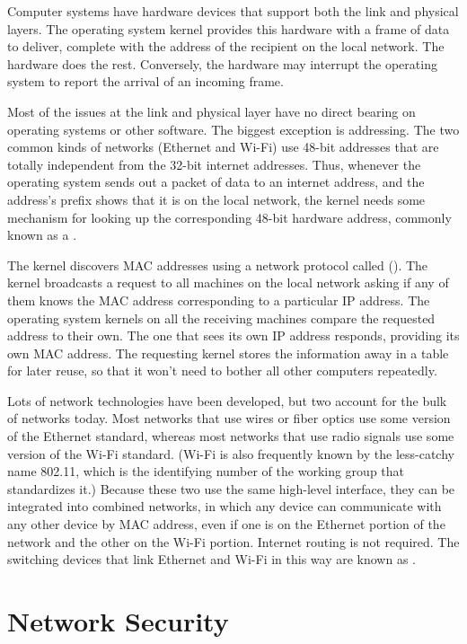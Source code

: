 Computer systems have hardware devices that support both the link and
physical layers.  The operating system kernel provides this hardware
with a frame of data to deliver, complete with the address of the
recipient on the local network.  The hardware does the rest.
Conversely, the hardware may interrupt the operating system to report
the arrival of an incoming frame.

Most of the issues at the link and physical layer have no direct
bearing on operating systems or other software.  The biggest exception
is addressing.  The two common kinds of networks (Ethernet and Wi-Fi)
use 48-bit addresses that are totally independent from the 32-bit
internet addresses.  Thus, whenever the operating system sends out a
packet of data to an internet address, and the address's prefix shows
that it is on
the local network, the kernel needs some mechanism for looking up the
corresponding 48-bit hardware address, commonly known as a
.

The kernel discovers MAC addresses using a network protocol called
 ().  The kernel
broadcasts a request to all machines on the local network asking if
any of them knows the MAC address corresponding to a particular IP
address.  The operating system kernels on all the receiving machines
compare the requested address to their own.  The one that sees its own
IP address responds, providing its own MAC address.  The requesting
kernel stores the information away in a table for later reuse, so that
it won't need to bother all other computers repeatedly.

Lots of network technologies have been developed, but two account for
the bulk of networks today.  Most networks that use wires or fiber
optics use some version of the Ethernet standard, whereas most
networks that use radio signals use some version of the Wi-Fi standard.
(Wi-Fi is also frequently known by the less-catchy name 802.11, which
is the identifying number of the working group that standardizes
it.)  Because these two use the same high-level interface, they can be
integrated into combined networks, in which any device can communicate
with any other device by MAC address, even if one is on the Ethernet
portion of the network and the other on the Wi-Fi portion.  Internet
routing is not required.  The switching devices that link Ethernet and
Wi-Fi in this way are known as .

\section{Network Security}\label{network-security-section}

